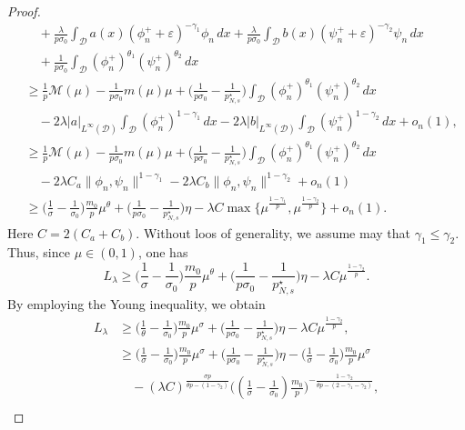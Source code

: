 \documentclass[10pt,a4paper]{amsart}
\numberwithin{equation}{section}
\begin{document}
\begin{proof}
\begin{equation}
\begin{aligned}
&\quad+\frac{\lambda}{p\sigma_0}\int_\mathcal{D} a(x)(\phi_n^++\varepsilon)^{-\gamma_1}\phi_n\,dx+\frac{\lambda}{p\sigma_0}\int_\mathcal{D}b(x)(\psi_n^++\varepsilon)^{-\gamma_2}\psi_n\,dx \\
&\quad+\frac{1}{p\sigma_0}\int_\mathcal{D}(\phi_n^+)^{\theta_1}(\psi_n^+)^{\theta_2}\,dx \\
&\geq\frac{1}{p}\mathscr{M}(\mu)-\frac{1}{p\sigma_0}m(\mu)\mu+\Big(\frac{1}{p\sigma_0}-\frac{1}{p^\star_{N,s}}\Big)\int_\mathcal{D}(\phi_n^+)^{\theta_1}(\psi_n^+)^{\theta_2}\,dx \\
&\quad-2\lambda|a|_{L^\infty(\mathcal{D})} \int_\mathcal{D} (\phi_n^+)^{1-\gamma_1}\,dx-2\lambda|b|_{L^\infty(\mathcal{D})} \int_\mathcal{D} (\psi_n^+)^{1-\gamma_2}\,dx+o_n(1), \\
&\geq\frac{1}{p}\mathscr{M}(\mu)-\frac{1}{p\sigma_0}m(\mu)\mu+\Big(\frac{1}{p\sigma_0}-\frac{1}{p^\star_{N,s}}\Big)\int_\mathcal{D}(\phi_n^+)^{\theta_1}(\psi_n^+)^{\theta_2}\,dx \\
&\quad-2\lambda C_a \| \phi_n,\psi_n\|^{1-\gamma_1}-2\lambda C_b \| \phi_n,\psi_n\|^{1-\gamma_2}+o_n(1) \\
&\geq\Big(\frac{1}{\sigma}-\frac{1}{\sigma_0}\Big)\frac{m_0}{p}\mu^\theta+\Big(\frac{1}{p\sigma_0}-\frac{1}{p^\star_{N,s}}\Big)\eta-\lambda C \max\lbrace \mu^\frac{1-\gamma_1}{p},\mu^\frac{1-\gamma_2}{p} \rbrace+o_n(1).
\end{aligned}
\end{equation}
Here $C=2(C_a+C_b)$. Without loos of generality, we assume may that
$\gamma_1\leq \gamma_2$. Thus, since $\mu\in (0,1)$, one has
\[
L_\lambda\geq\Big(\frac{1}{\sigma}-\frac{1}{\sigma_0}\Big)
\frac{m_0}{p}\mu^\theta+\Big(\frac{1}{p\sigma_0}
-\frac{1}{p^\star_{N,s}}\Big)\eta-\lambda C \mu^\frac{1-\gamma_2}{p} .
\]
By employing the Young inequality, we obtain
\begin{align*}
L_\lambda
&\geq \Big(\frac{1}{\theta}-\frac{1}{\sigma_0}\Big)
 \frac{m_0}{p}\mu^\sigma+\Big(\frac{1}{p\sigma_0}-\frac{1}{p^\star_{N,s}}\Big)\eta-\lambda C\mu^\frac{1-\gamma_2}{p},\\
&\geq \Big(\frac{1}{\sigma}-\frac{1}{\sigma_0}\Big)
 \frac{m_0}{p}\mu^\sigma+\Big(\frac{1}{p\sigma_0}-\frac{1}{p^\star_{N,s}}\Big)\eta-\Big(\frac{1}{\sigma}-\frac{1}{\sigma_0}\Big)\frac{m_0}{p}\mu^\sigma\\
&\quad -( \lambda C)^\frac{\sigma p}{\theta p-(1-\gamma_2)}
 \Big((\frac{1}{\sigma}-\frac{1}{\sigma_0})\frac{m_0}{p}\Big)^{-\frac{1-\gamma_2}{\theta p-(2-\gamma_1-\gamma_2)}} ,\\

\end{align*}
\end{proof}
\end{document}
